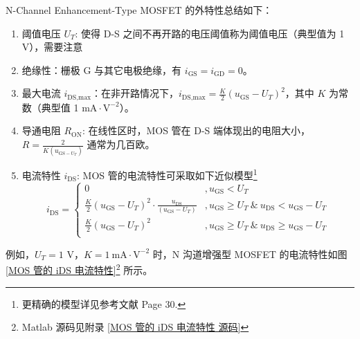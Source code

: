 \documentclass[UTF8]{report}
\theoremstyle{MyLineTheoremStyle} %
\theoremstyle{MyBlockTheoremStyle} %
\theoremstyle{MySubsubsectionStyle} %
\begin{document}
N-Channel Enhancement-Type MOSFET 的外特性总结如下：
\begin{enumerate}
\item 阈值电压 $U_T$: 使得 D-S 之间不再开路的电压阈值称为阈值电压（典型值为 1 V），需要注意 
\item 绝缘性：栅极 G 与其它电极绝缘，有 $i_{\text{GS}} = i_{\text{GD}} = 0$。
\item 最大电流 $i_{\text{DS},\text{max}}$：在非开路情况下，$i_{\text{DS},\text{max}} = \frac{K}{2}(u_{\text{GS}} - U_T)^2$，其中 $K$ 为常数（典型值 1 $\mathrm{mA\cdot V^{-2}}$）。
\item 导通电阻 $R_{\text{ON}}$: 在线性区时，MOS 管在 D-S 端体现出的电阻大小，$R = \frac{2}{K(u_{\text{GS} - U_T})}$ 通常为几百欧。
\item 电流特性 $i_{\text{DS}}$: MOS 管的电流特性可采取如下近似模型\footnote{更精确的模型详见参考文献 \cite{电路原理导学导教} Page 30.}
\begin{equation}
i_{\text{DS}} = 
\begin{cases}
    0 &, u_{\text{GS}} < U_T \\
    \frac{K}{2}(u_{\text{GS}} - U_T)^2\cdot \frac{u_{\text{DS}}}{(u_{\text{GS}} - U_T)} &, u_{\text{GS}} \geq U_T\ \& \ u_{\text{DS}} < u_{\text{GS}} - U_T \\ 
    \frac{K}{2}(u_{\text{GS}} - U_T)^2 &, u_{\text{GS}} \geq U_T\ \& \ u_{\text{DS}} \geqslant u_{\text{GS}} - U_T \\ 
\end{cases}
\end{equation}
\end{enumerate}




例如，$U_T = 1$ V，$K = 1\ \mathrm{mA \cdot V^{-2}}$ 时，N 沟道增强型 MOSFET 的电流特性如图 \ref{MOS 管的 iDS 电流特性}\footnote{Matlab 源码见附录 \ref{MOS 管的 iDS 电流特性 源码}} 所示。
\end{document}
